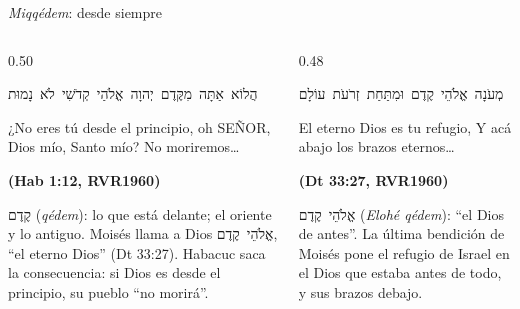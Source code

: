 \documentclass[hyperref={bookmarks=false},aspectratio=169]{beamer}
\newcommand{\heb}[1]{\mbox{\foreignlanguage{hebrew}{#1}}}
\newcommand{\SENOR}{S{\fontsize{0.78em}{1em}\selectfont EÑOR}}
\newcommand{\fuente}[1]{\par\hfill{\upshape\bfseries\footnotesize\textcolor{azul}{#1}}}
\begin{document}
\begin{frame}{\emph{Miqqédem}: desde siempre}
\begin{columns}[t,onlytextwidth]
\begin{column}{0.50\textwidth}
\begin{center}\heb{הֲלוֹא אַתָּה מִקֶּדֶם יְהוָה אֱלֹהַי קְדֹשִׁי לֹא נָמוּת}\end{center}
\begin{cita}¿No eres tú desde el principio, oh \SENOR, Dios mío, Santo mío? No moriremos\ldots\fuente{(Hab 1:12, RVR1960)}\end{cita}
\scriptsize \heb{קֶדֶם} (\emph{qédem}): lo que está delante; el oriente y lo antiguo. Moisés llama a Dios \heb{אֱלֹהֵי קֶדֶם}, ``el eterno Dios'' (Dt 33:27). Habacuc saca la consecuencia: si Dios es desde el principio, su pueblo ``no morirá''.
\end{column}
\begin{column}{0.48\textwidth}
\begin{center}\heb{מְעֹנָה אֱלֹהֵי קֶדֶם וּמִתַּחַת זְרֹעֹת עוֹלָם}\end{center}
\begin{cita}El eterno Dios es tu refugio, Y acá abajo los brazos eternos\ldots\fuente{(Dt 33:27, RVR1960)}\end{cita}
\scriptsize \heb{אֱלֹהֵי קֶדֶם} (\emph{Elohé qédem}): ``el Dios de antes''. La última bendición de Moisés pone el refugio de Israel en el Dios que estaba antes de todo, y sus brazos debajo.
\end{column}
\end{columns}
\end{frame}
\end{document}
